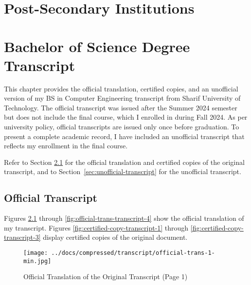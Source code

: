 
\chapter{Post-Secondary Institutions}\label{sec:post-secondary-institutions}

\chapter{Bachelor of Science Degree Transcript}\label{sec:transcript}

This chapter provides the official translation, certified copies, and an unofficial version of my BS in Computer Engineering transcript from Sharif University of Technology. The official transcript was issued after the Summer 2024 semester but does not include the final course, which I enrolled in during Fall 2024. As per university policy, official transcripts are issued only once before graduation. To present a complete academic record, I have included an unofficial transcript that reflects my enrollment in the final course.

Refer to Section \ref{sec:official-transcript} for the official translation and certified copies of the original transcript, and to Section~\ref{sec:unofficial-transcript} for the unofficial transcript.

\clearpage

\section{Official Transcript}\label{sec:official-transcript}

Figures \ref{fig:official-trans-transcript-1} through \ref{fig:official-trans-transcript-4} show the official translation of my transcript. Figures \ref{fig:certified-copy-transcript-1} through \ref{fig:certified-copy-transcript-3} display certified copies of the original document.

\vspace*{\fill}
\begin{figure}[H]
    \centering
    \texttt{[image: ../docs/compressed/transcript/official-trans-1-min.jpg]}
    \caption{Official Translation of the Original Transcript (Page 1)}
    \label{fig:official-trans-transcript-1}
\end{figure}
\vspace*{\fill}

\clearpage

